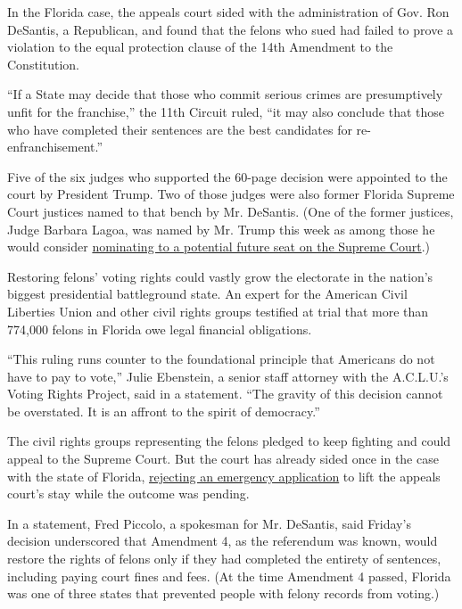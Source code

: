 In the Florida case, the appeals court sided with the administration of
Gov. Ron DeSantis, a Republican, and found that the felons who sued had
failed to prove a violation to the equal protection clause of the 14th
Amendment to the Constitution.

``If a State may decide that those who commit serious crimes are
presumptively unfit for the franchise,'' the 11th Circuit ruled, ``it
may also conclude that those who have completed their sentences are the
best candidates for re-enfranchisement.''

Five of the six judges who supported the 60-page decision were appointed
to the court by President Trump. Two of those judges were also former
Florida Supreme Court justices named to that bench by Mr. DeSantis. (One
of the former justices, Judge Barbara Lagoa, was named by Mr. Trump this
week as among those he would consider
\href{https://www.nytimes3xbfgragh.onion/2020/09/09/us/trump-supreme-court-list.html}{nominating
to a potential future seat on the Supreme Court}.)

Restoring felons' voting rights could vastly grow the electorate in the
nation's biggest presidential battleground state. An expert for the
American Civil Liberties Union and other civil rights groups testified
at trial that more than 774,000 felons in Florida owe legal financial
obligations.

``This ruling runs counter to the foundational principle that Americans
do not have to pay to vote,'' Julie Ebenstein, a senior staff attorney
with the A.C.L.U.'s Voting Rights Project, said in a statement. ``The
gravity of this decision cannot be overstated. It is an affront to the
spirit of democracy.''

The civil rights groups representing the felons pledged to keep fighting
and could appeal to the Supreme Court. But the court has already sided
once in the case with the state of Florida,
\href{https://www.nytimes3xbfgragh.onion/2020/07/16/us/supreme-court-felons-voting-florida.html}{rejecting
an emergency application} to lift the appeals court's stay while the
outcome was pending.

In a statement, Fred Piccolo, a spokesman for Mr. DeSantis, said
Friday's decision underscored that Amendment 4, as the referendum was
known, would restore the rights of felons only if they had completed the
entirety of sentences, including paying court fines and fees. (At the
time Amendment 4 passed, Florida was one of three states that prevented
people with felony records from voting.)

